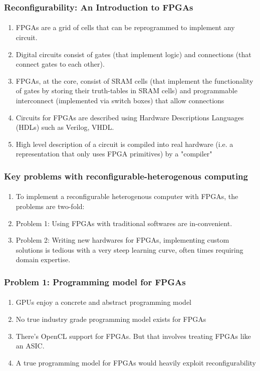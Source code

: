 \documentclass{beamer}
\begin{document}
\begin{frame}[fragile]
\frametitle{Reconfigurability: An Introduction to FPGAs}
\framesubtitle{}
  \begin{enumerate}
    \item FPGAs are a grid of cells that can be reprogrammed to implement
      any circuit. 
    \item Digital circuits consist of gates (that implement logic) and
      connections (that connect gates to each other).
    \item FPGAs, at the core, consist of SRAM cells (that implement the
      functionality of gates by storing their truth-tables in SRAM cells) and
      programmable interconnect (implemented via switch boxes) that allow
      connections
    \item Circuits for FPGAs are described using Hardware Descriptions Languages
      (HDLs) such as Verilog, VHDL.
    \item High level description of a circuit is compiled into real hardware
      (i.e. a representation that only uses FPGA primitives) by a "compiler"
  \end{enumerate}

\end{frame}

\begin{frame}[fragile]
\frametitle{Key problems with reconfigurable-heterogenous computing}
\framesubtitle{}
  \begin{enumerate}
    \item To implement a reconfigurable heterogenous computer with FPGAs,
      the problems are two-fold:
    \item Problem 1: Using FPGAs with traditional softwares are in-convenient.
    \item Problem 2: Writing new hardwares for FPGAs, implementing custom solutions is
      tedious with a very steep learning curve, often times requiring 
      domain expertise.
  \end{enumerate}
\end{frame}

\begin{frame}[fragile]
\frametitle{Problem 1: Programming model for FPGAs}
\framesubtitle{}
  \begin{enumerate}
    \item GPUs enjoy a concrete and abstract programming model
    \item No true industry grade programming model exists for FPGAs
    \item There's OpenCL support for FPGAs. But that involves treating
      FPGAs like an ASIC.
    \item A true programming model for FPGAs would heavily exploit
      reconfigurability
  \end{enumerate}
\end{frame}
\end{document}
